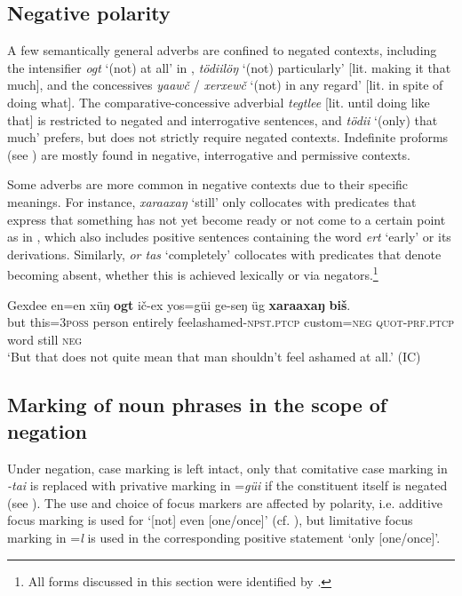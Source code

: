\documentclass[output=paper,colorlinks,citecolor=brown,chinesefont]{langscibook}
\begin{document}
\subsection{Negative polarity}\label{sec:kha:4.2}

A few semantically general adverbs are confined to negated contexts, including the intensifier \textit{ogt} ‘(not) at all’ in , \textit{tödiilöŋ} ‘(not) particularly’ [lit. making it that much], and the concessives \textit{yaawč} / \textit{xerxewč} ‘(not) in any regard’ [lit. in spite of doing what]. The comparative-concessive adverbial \textit{tegtlee} [lit. until doing like that] is restricted to negated and interrogative sentences, and \textit{tödii} ‘(only) that much’ prefers, but does not strictly require negated contexts. Indefinite proforms (see ) are mostly found in negative, interrogative and permissive contexts.

Some adverbs are more common in negative contexts due to their specific meanings. For instance, \textit{xaraaxaŋ} ‘still’ only collocates with predicates that express that something has not yet become ready or not come to a certain point as in , which also includes positive sentences containing the word \textit{ert} ‘early’ or its derivations. Similarly, \textit{or tas} ‘completely’ collocates with predicates that denote becoming absent, whether this is achieved lexically or via negators.\footnote{All forms discussed in this section were identified by \citet[109]{Kim2016}.}

\ea\label{ex:kha:77}
    \gll  Gexdee   en=en   xüŋ \textbf{ogt} ič-ex yos=güi ge-seŋ üg \textbf{xaraaxaŋ} \textbf{biš}. \\ 
         but this=\textsc{3poss} person entirely feel\textunderscore ashamed-\textsc{npst.ptcp} custom=\textsc{neg} \textsc{quot-prf.ptcp} word still \textsc{neg} \\
    \glt ‘But that does not quite mean that man shouldn’t feel ashamed at all.’ (IC)
\z


\subsection{Marking of noun phrases in the scope of negation}\label{sec:kha:4.3}

Under negation, case marking is left intact, only that comitative case marking in \textit{-tai} is replaced with privative marking in =\textit{güi} if the constituent itself is negated (see ). The use and choice of focus markers are affected by polarity, i.e. additive focus marking is used for ‘[not] even [one/once]’ (cf. ), but limitative focus marking in =\textit{l} is used in the corresponding positive statement ‘only [one/once]’. 
\end{document}
